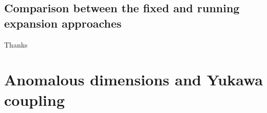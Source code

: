 \documentclass[%
reprint,
superscriptaddress,
showpacs,preprintnumbers,
 amsmath,amssymb,
 aps,
prd,
]{revtex4-1}
\begin{document}
\subsection{Comparison between the fixed and running expansion approaches}
\label{sec:expansion}






































\acknowledgments
Thanks



\appendix

\section{Anomalous dimensions and Yukawa coupling}
\label{app:anom}
\end{document}
